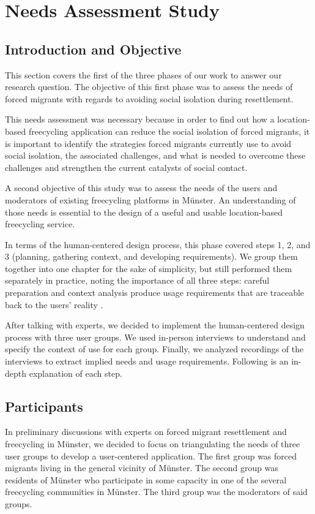 \chapter{Needs Assessment Study}
\label{cha:needs}


\section{Introduction and Objective}

This section covers the first of the three phases of our work to answer our research question. The objective of this first phase was to assess the needs of forced migrants with regards to avoiding social isolation during resettlement.

This needs assessment was necessary because in order to find out how a location-based freecycling application can reduce the social isolation of forced migrants, it is important to identify the strategies forced migrants currently use to avoid social isolation, the associated challenges, and what is needed to overcome these challenges and strengthen the current catalysts of social contact.

A second objective of this study was to assess the needs of the users and moderators of existing freecycling platforms in Münster. An understanding of those needs is essential to the design of a useful and usable location-based freecycling service.

In terms of the human-centered design process, this phase covered steps 1, 2, and 3 (planning, gathering context, and developing requirements). We group them together into one chapter for the sake of simplicity, but still performed them separately in practice, noting the importance of all three steps: careful preparation and context analysis produce usage requirements that are traceable back to the users' reality \cite{riedemann_context_2018}.

After talking with experts, we decided to implement the human-centered design process with three user groups. We used in-person interviews to understand and specify the context of use for each group. Finally, we analyzed recordings of the interviews to extract implied needs and usage requirements. Following is an in-depth explanation of each step.


\section{Participants}

In preliminary discussions with experts on forced migrant resettlement and freecycling in Münster, we decided to focus on triangulating the needs of three user groups to develop a user-centered application. The first group was forced migrants living in the general vicinity of Münster. The second group was residents of Münster who participate in some capacity in one of the several freecycling communities in Münster. The third group was the moderators of said groups.


